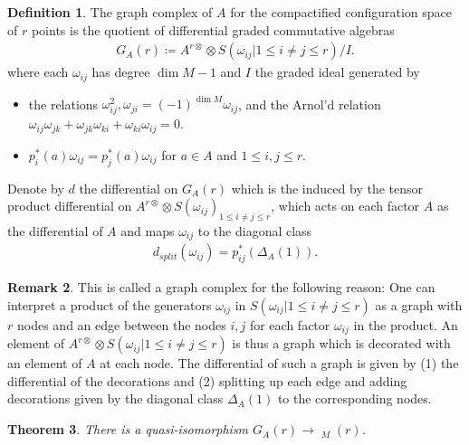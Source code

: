 \documentclass{scrartcl}
\theoremstyle{plain}
\newtheorem{theorem}{Theorem}[section]
\theoremstyle{definition}
\newtheorem{definition}[theorem]{Definition}
\newtheorem{remark}[theorem]{Remark}
\newcommand{\defeq}{\coloneqq}
\DeclareMathOperator{\cConf}{\overline{Conf}}
\begin{document}
\begin{definition}
    The graph complex of $A$ for the compactified configuration space of $r$ points is the quotient of differential graded commutative algebras
\begin{align*}
    G_A(r) \defeq A^{r\otimes} \otimes S(\omega_{ij} | {1 \leq i\neq j\leq r}) / I.
\end{align*}
where each $\omega_{ij}$ has degree $\dim M-1$ and $I$ the graded ideal generated by 
\begin{itemize}
    \item the relations $\omega_{ij}^2, \omega_{ji} = (-1)^{\dim M} \omega_{ij}$, and the Arnol'd relation $\omega_{ij}\omega_{jk} + \omega_{jk}\omega_{ki} + \omega_{ki}\omega_{ij} = 0$.
    \item $p_i^*(a)\omega_{ij} = p_j^*(a)\omega_{ij}$ for $a\in A$ and $1\leq i, j \leq r$. 
\end{itemize}
\end{definition}

Denote by $d$ the differential on $G_A(r)$ which is the induced by the tensor product differential on $A^{r\otimes} \otimes S(\omega_{ij})_{1 \leq i\neq j\leq r}$, which acts on each factor $A$ as the differential of $A$ and maps $\omega_{ij}$ to the diagonal class 
\begin{align*}
    d_{split}(\omega_{ij}) = p_{ij}^*(\Delta_A(1)).
\end{align*}

\begin{remark}\label{rmk:graph-complex}
    This is called a graph complex for the following reason: One can interpret a product of the generators $\omega_{ij}$ in $S(\omega_{ij} | {1 \leq i\neq j\leq r})$ as a graph with $r$ nodes and an edge between the nodes $i, j$ for each factor $\omega_{ij}$ in the product. An element of $A^{r\otimes} \otimes S(\omega_{ij} | {1 \leq i\neq j\leq r})$ is thus a graph which is decorated with an element of $A$ at each node. The differential of such a graph is given by (1) the differential of the decorations and (2) splitting up each edge and adding decorations given by the diagonal class $\Delta_A(1)$ to the corresponding nodes. 
\end{remark}

\begin{theorem}
    There is a quasi-isomorphism $G_A(r)\to \cConf_M(r)$.
\end{theorem}
\end{document}
